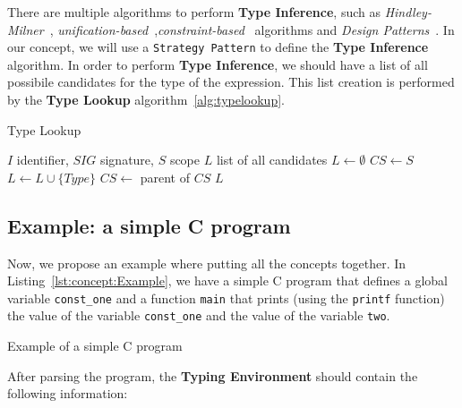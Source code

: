 There are multiple algorithms to perform \textbf{Type Inference}, such as \textit{Hindley-Milner}~\cite{Hindley69, Milner78}, \textit{unification-based}~\cite{Robinson65},\textit{constraint-based}~\cite{Pierce02} algorithms and \textit{Design Patterns}~\cite{Gamma95}. In our concept, we will use a \texttt{Strategy Pattern} to define the \textbf{Type Inference} algorithm.
In order to perform \textbf{Type Inference}, we should have a list of all possibile candidates for the type of the expression. This list creation is performed by the \textbf{Type Lookup} algorithm~\ref{alg:typelookup}.

\begin{algorithm}[h]
\caption{Type Lookup\label{alg:typelookup}}
\begin{algorithmic}
\Require $I$ identifier, $SIG$ signature, $S$ scope
\Ensure$L$ list of all candidates
\State $L\gets\emptyset$ 
\State $CS \gets S$
\State $L \gets L\cup\{Type\}$
\EndIf
\EndFor
\State $CS \gets$ parent of $CS$ 
\EndWhile
\State\Return $L$
\end{algorithmic}
\end{algorithm}

\subsection{Example: a simple C program}\label{subsec:concept:ExampleASimpleCProgram}

Now, we propose an example where putting all the concepts together. In Listing~\ref{lst:concept:Example}, we have a simple C program that defines a global variable \texttt{const\_one} and a function \texttt{main} that prints (using the \texttt{printf} function) the value of the variable \texttt{const\_one} and the value of the variable \texttt{two}.

\begin{Listing}[tbh]
    \centering
    \caption{Example of a simple C program}
    \label{lst:concept:Example}
\end{Listing}

After parsing the program, the \textbf{Typing Environment} should contain the following information:

